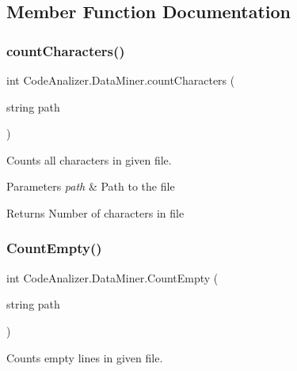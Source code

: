 \subsection{Member Function Documentation}
\mbox{\label{class_code_analizer_1_1_data_miner_ad12c71980401c62499f06c7417a1e59c}} 
\subsubsection{\texorpdfstring{count\+Characters()}{countCharacters()}}
{\footnotesize\ttfamily int Code\+Analizer.\+Data\+Miner.\+count\+Characters (\begin{DoxyParamCaption}\item[{string}]{path }\end{DoxyParamCaption})}



Counts all characters in given file. 


\begin{DoxyParams}{Parameters}
{\em path} & Path to the file\\
\hline
\end{DoxyParams}
\begin{DoxyReturn}{Returns}
Number of characters in file
\end{DoxyReturn}
\mbox{\label{class_code_analizer_1_1_data_miner_a5071efa31874229befaefa1ec5f4dfcb}} 
\subsubsection{\texorpdfstring{Count\+Empty()}{CountEmpty()}}
{\footnotesize\ttfamily int Code\+Analizer.\+Data\+Miner.\+Count\+Empty (\begin{DoxyParamCaption}\item[{string}]{path }\end{DoxyParamCaption})}



Counts empty lines in given file. 


